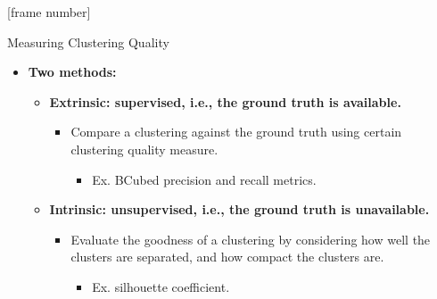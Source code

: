 \documentclass[aspectratio=169,t,xcolor=dvipsnames]{beamer}
\begin{document}
  {
    [frame number]
    \begin{frame}{Measuring Clustering Quality}
      \begin{itemize}
        \item \textbf{Two methods:}
        \begin{itemize}
          \item \textbf{{\color{airforceblue}Extrinsic}: supervised, i.e., the ground truth is available.}
          \begin{itemize}
            \item Compare a clustering against the ground truth using certain clustering quality measure.
            \begin{itemize}
              \item Ex. BCubed precision and recall metrics.
            \end{itemize}
          \end{itemize}
          \item \textbf{{\color{airforceblue}Intrinsic}: unsupervised, i.e., the ground truth is unavailable.}
          \begin{itemize}
            \item Evaluate the goodness of a clustering by considering how well the clusters are separated, and how compact the clusters are.
            \begin{itemize}
              \item Ex. silhouette coefficient.
            \end{itemize}
          \end{itemize}
        \end{itemize}
      \end{itemize}
    \end{frame}
  }
\end{document}
